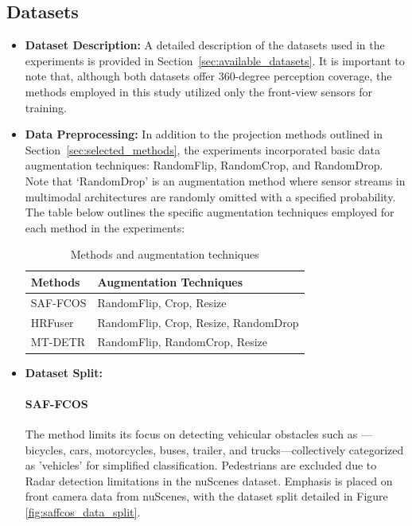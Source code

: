 \documentclass[report.tex]{subfiles}
\begin{document}
        \subsection{Datasets}
        \begin{itemize}
            \item \textbf{Dataset Description:} A detailed description of the datasets used in the experiments is provided in Section~\ref{sec:available_datasets}. It is important to note that, although both datasets offer 360-degree perception coverage, the methods employed in this study utilized only the front-view sensors for training.

            \item \textbf{Data Preprocessing:} In addition to the projection methods outlined in Section~\ref{sec:selected_methods}, the experiments incorporated basic data augmentation techniques: RandomFlip, RandomCrop, and RandomDrop. Note that `RandomDrop' is an augmentation method where sensor streams in multimodal architectures are randomly omitted with a specified probability. The table below outlines the specific augmentation techniques employed for each method in the experiments:
                \begin{table}[h]
                    \centering
                    \caption{Methods and augmentation techniques}
                    \begin{tabular}{|l|l|}
                    \hline
                    \textbf{Methods} & \textbf{Augmentation Techniques} \\ \hline
                    SAF-FCOS & RandomFlip, Crop, Resize \\ \hline
                    HRFuser & RandomFlip, Crop, Resize, RandomDrop \\ \hline
                    MT-DETR & RandomFlip, RandomCrop, Resize \\ \hline
                    \end{tabular}
                    \label{tab:methods_augmentation}
                \end{table}

            \item \textbf{Dataset Split:} 
            
            \paragraph*{SAF-FCOS}

            The method limits its focus on detecting vehicular obstacles such as — bicycles, cars, motorcycles, buses, trailer, and trucks—collectively categorized as 'vehicles' for simplified classification. Pedestrians are excluded due to Radar detection limitations in the nuScenes dataset. Emphasis is placed on front camera data from nuScenes, with the dataset split detailed in Figure \ref{fig:saffcos_data_split}.


\end{itemize}
\end{document}
